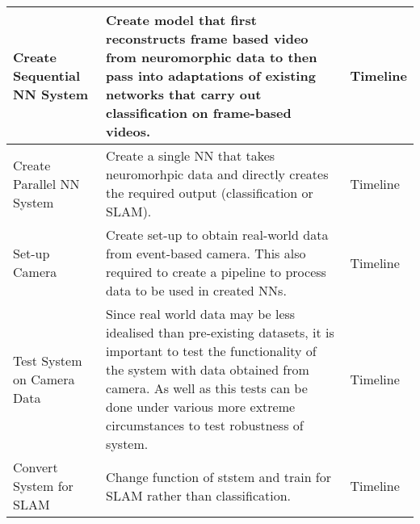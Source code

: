 \begin{longtable}{|| P{0.2\textwidth} | P{.45\textwidth} | P{.15\textwidth} ||}
    \hline
    Create Sequential NN System                          & Create model that first reconstructs frame based video from neuromorphic data to then pass into adaptations of existing networks that carry out classification on frame-based videos.                                                                                                                                                                                                                                             & Timeline                                  \\
    \hline
    Create Parallel NN System                            & Create a single NN that takes neuromorhpic data and directly creates the required output (classification or SLAM).                                                                                                                                                                                                                                                                                                                & Timeline                                  \\
    \hline
    Set-up Camera                                        & Create set-up to obtain real-world data from event-based camera. This also required to create a pipeline to process data to be used in created NNs.                                                                                                                                                                                                                                                                               & Timeline                                  \\
    \hline
    Test System on Camera Data                           & Since real world data may be less idealised than pre-existing datasets, it is important to test the functionality of the system with data obtained from camera. As well as this tests can be done under various more extreme circumstances to test robustness of system.                                                                                                                                                          & Timeline                                  \\
    \hline
    Convert System for SLAM                              & Change function of ststem and train for SLAM rather than classification.                                                                                                                                                                                                                                                                                                                                                          & Timeline                                  \\

\end{longtable}

